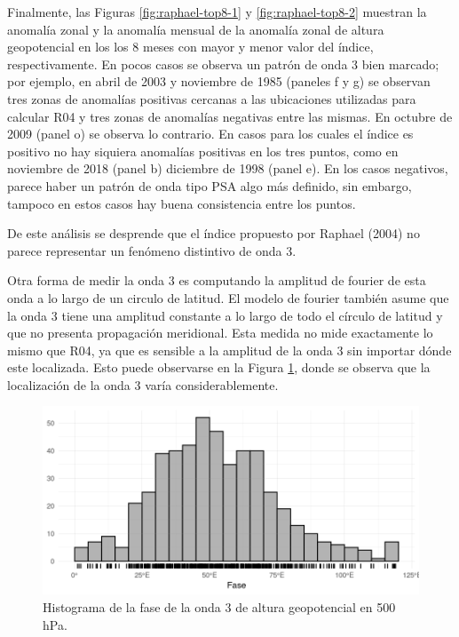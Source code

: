 \documentclass[12pt,oneside,a4paper]{reedthesis}
\begin{document}
Finalmente, las Figuras \ref{fig:raphael-top8-1} y \ref{fig:raphael-top8-2} muestran la anomalía zonal y la anomalía mensual de la anomalía zonal de altura geopotencial en los los 8 meses con mayor y menor valor del índice, respectivamente.
En pocos casos se observa un patrón de onda 3 bien marcado; por ejemplo, en abril de 2003 y noviembre de 1985 (paneles f y g) se observan tres zonas de anomalías positivas cercanas a las ubicaciones utilizadas para calcular R04 y tres zonas de anomalías negativas entre las mismas.
En octubre de 2009 (panel o) se observa lo contrario.
En casos para los cuales el índice es positivo no hay siquiera anomalías positivas en los tres puntos, como en noviembre de 2018 (panel b) diciembre de 1998 (panel e).
En los casos negativos, parece haber un patrón de onda tipo PSA algo más definido, sin embargo, tampoco en estos casos hay buena consistencia entre los puntos.

De este análisis se desprende que el índice propuesto por Raphael (2004) no parece representar un fenómeno distintivo de onda 3.

Otra forma de medir la onda 3 es computando la amplitud de fourier de esta onda a lo largo de un circulo de latitud.
El modelo de fourier también asume que la onda 3 tiene una amplitud constante a lo largo de todo el círculo de latitud y que no presenta propagación meridional.
Esta medida no mide exactamente lo mismo que R04, ya que es sensible a la amplitud de la onda 3 sin importar dónde este localizada.
Esto puede observarse en la Figura \ref{fig:fase-histogram}, donde se observa que la localización de la onda 3 varía considerablemente.

\begin{figure}

{\centering \includegraphics{figures/15-onda3/fase-histogram-1} 

}

\caption{Histograma de la fase de la onda 3 de altura geopotencial en 500 hPa.}\label{fig:fase-histogram}
\end{figure}
\end{document}

